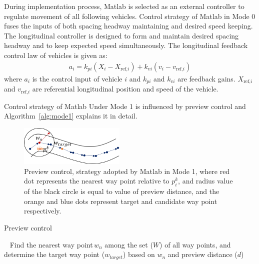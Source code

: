 \documentclass[conference]{IEEEtran}
\begin{document}
	During implementation process, Matlab is selected as an external controller to regulate movement of all following vehicles. Control strategy of Matlab in Mode 0 fuses the inputs of both spacing headway maintaining and desired speed keeping. The longitudinal controller is designed to form and maintain desired spacing headway and to keep expected speed simultaneously. The longitudinal feedback control law of vehicles is given as:
\begin{eqnarray}
	\label{equ:pidcontrol}
	a_i=k_{pi}(X_i-X_{\text{ref,}i})+k_{vi}(v_i-v_{\text{ref,}i})
\end{eqnarray}
where $a_i$ is the control input of vehicle $i$ and $k_{pi}$ and $k_{vi}$ are feedback gains. $X_{\text{ref,}i}$ and $v_{\text{ref,}i}$ are referential longitudinal position and speed of the vehicle. 

Control strategy of Matlab Under Mode 1 is influenced by preview control and Algorithm~\ref{alg:mode1} explains it in detail.
\begin{figure}
\label{fig:explain}
\includegraphics[width=0.45\textwidth]{figure/algExplain.png}
\caption{Preview control, strategy adopted by Matlab in Mode 1, where red dot represents the nearest way point relative to $p_i^k$, and radius value of the black circle is equal to value of preview distance, and the orange and blue dots represent target and candidate way point respectively.}
\end{figure}
\begin{algorithm}[htbp]
	\label{alg:mode1}
	\caption{Preview control}
	\LinesNumbered 
	Find the nearest way point\,$w_n$ among the set ($W$) of all way points, and determine the target way point ($w_{target}$) based on $w_n$ and preview distance ($d$)\;
\end{algorithm}
\end{document}
